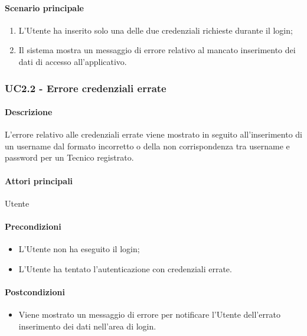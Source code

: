 \paragraph*{Scenario principale}
\begin{enumerate}
  \item L’Utente ha inserito solo una delle due credenziali richieste durante il login;
  \item Il sistema mostra un messaggio di errore relativo al mancato inserimento dei dati di accesso all’applicativo.   
\end{enumerate}


\subsubsection{UC2.2 - Errore credenziali errate}\label{UC2point2}
\paragraph*{Descrizione}
L’errore relativo alle credenziali errate viene mostrato in seguito all’inserimento di un username dal formato incorretto o della non corrispondenza tra username e password per un Tecnico registrato.

\paragraph*{Attori principali}
Utente

\paragraph*{Precondizioni}
\begin{itemize}
  \item L’Utente non ha eseguito il login;
  \item L’Utente ha tentato l’autenticazione con credenziali errate.  
\end{itemize}

\paragraph*{Postcondizioni}
\begin{itemize}
  \item Viene mostrato un messaggio di errore per notificare l’Utente dell’errato inserimento dei dati nell’area di login.
\end{itemize}


